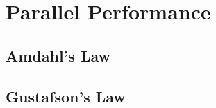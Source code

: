 \section{Parallel Performance}
\label{sec:parallel performance}


\subsection{Amdahl's Law}
\label{sec:amdahls law}


\subsection{Gustafson's Law}
\label{sec:gustafsons law}


